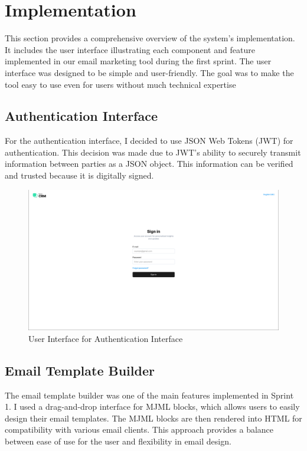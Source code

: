 \section{Implementation}
This section provides a comprehensive overview of the system's implementation. It includes the user interface illustrating each component and feature implemented in our email marketing tool during the first sprint. The user interface was designed to be simple and user-friendly. The goal was to make the tool easy to use even for users without much technical expertise

\subsection{Authentication Interface}

For the authentication interface, I decided to use JSON Web Tokens (JWT) for authentication. This decision was made due to JWT’s ability to securely transmit information between parties as a JSON object. This information can be verified and trusted because it is digitally signed.

\begin{figure}[ht]
	\centering
	\includegraphics[width=0.9\linewidth]{Images/Sprint1/screenshots/Screenshot 2024-05-26 214007.png}
	\caption{User Interface for Authentication Interface}
	\label{fig: User Interface for Authentication Interface}
\end{figure}

\subsection{Email Template Builder}

The email template builder was one of the main features implemented in Sprint 1. I used a drag-and-drop interface for MJML blocks, which allows users to easily design their email templates. The MJML blocks are then rendered into HTML for compatibility with various email clients. This approach provides a balance between ease of use for the user and flexibility in email design.

